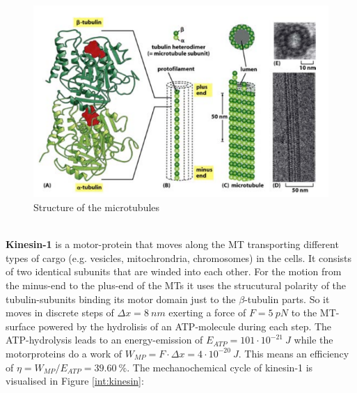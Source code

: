 		\begin{figure}[h]
		 			\centering
		 		   	\captionsetup{justification=raggedright, margin =4cm}            
		 		    	  \includegraphics[scale=0.3]{pic/mt.png}
		 		    \caption{Structure of the microtubules\cite{PA}}
		 		   	\label{int:MT} 
		\end{figure}\\
		\textbf{Kinesin-1} is a motor-protein that moves along the MT transporting different types of cargo (e.g. vesicles, mitochrondria, chromosomes) in the cells. It consists of two identical subunits that are winded into each other. For the motion from the minus-end to the plus-end of the MTs it uses the strucutural polarity of the tubulin-subunits binding its motor domain just to the $\beta$-tubulin parts. So it moves in discrete steps of $\Delta x = 8\  \unit{nm}$ exerting a force of $F = 5\ \unit{pN}$ to the MT-surface powered by the hydrolisis of an ATP-molecule during each step. The ATP-hydrolysis leads to an energy-emission of $E_{ATP} = 101 \cdot 10^{-21}\ \unit{J}$ while the motorproteins do a work of $W_{MP} = F \cdot \Delta x = 4 \cdot 10^{-20}\ \unit{J}$. This means an efficiency of $\eta = W_{MP} / E_{ATP} = 39.60\ \unit{\%}$.\cite{PA} The mechanochemical cycle of kinesin-1 is visualised in Figure \ref{int:kinesin}:
